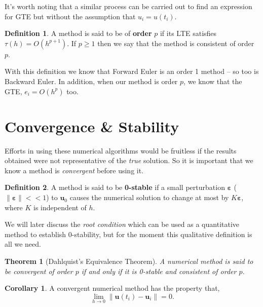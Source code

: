 \documentclass[12pt, twoside]{report}
\theoremstyle{plain}
\newtheorem{theorem}{Theorem}[chapter]
\theoremstyle{definition}
\newtheorem{definition}{Definition}[chapter]
\newtheorem{corollary}{Corollary}[theorem]
\theoremstyle{definition}
\providecommand{\norm}[1]{\lVert#1\rVert}
\begin{document}
        It's worth noting that a similar process can be carried out to find an expression for GTE but without the assumption that 
        $u_i=u(t_i)$. 
        \begin{definition}
            A method is said to be of \textbf{order} $p$ if its LTE satisfies 
            $\tau(h)=O(h^{p+1})$. If $p \ge 1$ then we say that the method is
            consistent of order $p$.
        \end{definition}
        With this definition we know that Forward Euler is an order 1 method 
        -- so too is Backward Euler. In addition, when our method is order $p$,
        we know that the GTE, $e_i=O(h^p)$ too.


    \section{Convergence \& Stability}
    \label{2_stability}
        Efforts in using these numerical algorithms would be fruitless if the 
        results obtained were not representative of the \textit{true} solution.
        So it is important that we know a method is \textit{convergent} before 
        using it.

        \begin{definition}
            A method is said to be \textbf{0-stable} if a small perturbation 
            $\boldsymbol{\varepsilon}$ ($\norm{\boldsymbol{\varepsilon}} 
            << 1$) to $\mathbf{u}_0$ causes the numerical solution to change 
            at most by $K\boldsymbol{\varepsilon}$, where $K$ is independent 
            of $h$.
        \end{definition}

        We will later discuss the \textit{root condition} which can be used as
        a quantitative method to establish 0-stability, but for the moment this
        qualitative definition is all we need.

        \begin{theorem}[Dahlquist's Equivalence Theorem]
        \label{2_dahlquist}
            A numerical method is said to be convergent of order $p$ if and 
            only if it is 0-stable and consistent of order $p$.
        \end{theorem}

        \begin{corollary}
        \label{2_dahlquist_corollary}
            A convergent numerical method has the property that,
            \begin{equation}
                \lim_{h \to 0} \norm{\mathbf{u}(t_i) - \mathbf{u}_i} = 0.
            \end{equation}
        \end{corollary}
\end{document}
